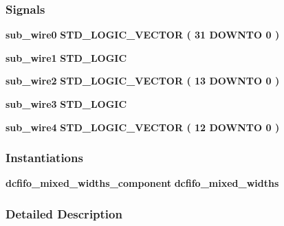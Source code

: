 \subsubsection*{Signals}
 \begin{DoxyCompactItemize}
\item 
{\bf sub\+\_\+wire0} {\bfseries \textcolor{comment}{S\+T\+D\+\_\+\+L\+O\+G\+I\+C\+\_\+\+V\+E\+C\+T\+OR}\textcolor{vhdlchar}{ }\textcolor{vhdlchar}{(}\textcolor{vhdlchar}{ }\textcolor{vhdlchar}{ } \textcolor{vhdldigit}{31} \textcolor{vhdlchar}{ }\textcolor{keywordflow}{D\+O\+W\+N\+TO}\textcolor{vhdlchar}{ }\textcolor{vhdlchar}{ } \textcolor{vhdldigit}{0} \textcolor{vhdlchar}{ }\textcolor{vhdlchar}{)}\textcolor{vhdlchar}{ }} 
\item 
{\bf sub\+\_\+wire1} {\bfseries \textcolor{comment}{S\+T\+D\+\_\+\+L\+O\+G\+IC}\textcolor{vhdlchar}{ }} 
\item 
{\bf sub\+\_\+wire2} {\bfseries \textcolor{comment}{S\+T\+D\+\_\+\+L\+O\+G\+I\+C\+\_\+\+V\+E\+C\+T\+OR}\textcolor{vhdlchar}{ }\textcolor{vhdlchar}{(}\textcolor{vhdlchar}{ }\textcolor{vhdlchar}{ } \textcolor{vhdldigit}{13} \textcolor{vhdlchar}{ }\textcolor{keywordflow}{D\+O\+W\+N\+TO}\textcolor{vhdlchar}{ }\textcolor{vhdlchar}{ } \textcolor{vhdldigit}{0} \textcolor{vhdlchar}{ }\textcolor{vhdlchar}{)}\textcolor{vhdlchar}{ }} 
\item 
{\bf sub\+\_\+wire3} {\bfseries \textcolor{comment}{S\+T\+D\+\_\+\+L\+O\+G\+IC}\textcolor{vhdlchar}{ }} 
\item 
{\bf sub\+\_\+wire4} {\bfseries \textcolor{comment}{S\+T\+D\+\_\+\+L\+O\+G\+I\+C\+\_\+\+V\+E\+C\+T\+OR}\textcolor{vhdlchar}{ }\textcolor{vhdlchar}{(}\textcolor{vhdlchar}{ }\textcolor{vhdlchar}{ } \textcolor{vhdldigit}{12} \textcolor{vhdlchar}{ }\textcolor{keywordflow}{D\+O\+W\+N\+TO}\textcolor{vhdlchar}{ }\textcolor{vhdlchar}{ } \textcolor{vhdldigit}{0} \textcolor{vhdlchar}{ }\textcolor{vhdlchar}{)}\textcolor{vhdlchar}{ }} 
\end{DoxyCompactItemize}
\subsubsection*{Instantiations}
 \begin{DoxyCompactItemize}
\item 
{\bf dcfifo\+\_\+mixed\+\_\+widths\+\_\+component}  {\bfseries dcfifo\+\_\+mixed\+\_\+widths}   
\end{DoxyCompactItemize}


\subsubsection{Detailed Description}


